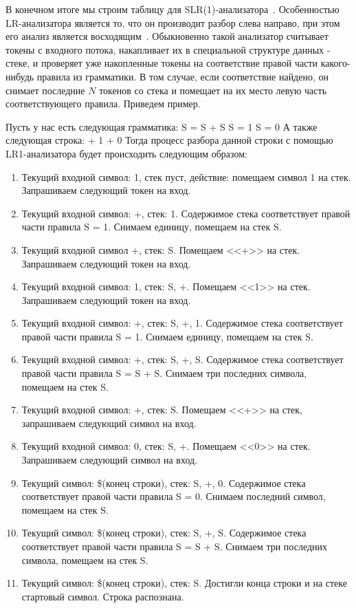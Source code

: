 В конечном итоге мы строим таблицу для SLR(1)-анализатора~\autocite{slr1}. Особенностью LR-анализатора является то, что он производит разбор слева направо, при этом его анализ является восходящим~\autocite{GLR-pars-algo}. Обыкновенно такой анализатор считывает токены с входного потока, накапливает их в специальной структуре данных - стеке, и проверяет уже накопленные токены на соответствие правой части какого-нибудь правила из грамматики. В том случае, если соответствие найдено, он снимает последние $N$ токенов со стека и помещает на их место левую часть соответствующего правила. Приведем пример.
\begin{myexample}
\label{examp:LRParser}
Пусть у нас есть следующая грамматика:\newline
S = S + S\newline
S = 1\newline
S = 0\newline
А также следующая строка: + 1 + 0\newline
Тогда процесс разбора данной строки с помощью LR1-анализатора будет происходить следующим образом:\newline
\begin{enumerate}
  \item Текущий входной символ: 1, стек пуст, действие: помещаем символ 1 на стек. Запрашиваем следующий токен на вход.
  \item Текущий входной символ: +, стек: 1. Содержимое стека соответствует правой части правила S = 1. Снимаем единицу, помещаем на стек S.
  \item Текущий входной символ +, стек: S. Помещаем <<+>> на стек. Запрашиваем следующий токен на вход.
  \item Текущий входной символ: 1, стек: S, +. Помещаем <<1>> на стек. Запрашиваем следующий токен на вход.
  \item Текущий входной символ: +, стек: S, +, 1. Содержимое стека соответствует правой части правила S = 1. Снимаем единицу, помещаем на стек S.
  \item Текущий входной символ: +, стек: S, +, S. Содержимое стека соответствует правой части правила S = S + S. Снимаем три последних символа, помещаем на стек S.
  \item Текущий входной символ: +, стек: S. Помещаем <<+>> на стек, запрашиваем следующий символ на вход.
  \item Текущий входной символ: 0, стек: S, +. Помещаем <<0>> на стек. Запрашиваем следующий символ на вход.
  \item Текущий символ: \$(конец строки), стек: S, +, 0. Содержимое стека соответствует правой части правила S = 0. Снимаем последний символ, помещаем на стек S.
  \item Текущий символ: \$(конец строки), стек: S, +, S. Содержимое стека соответствует правой части правила S = S + S. Снимаем три последних символа, помещаем на стек S.
  \item Текущий символ: \$(конец строки), стек: S. Достигли конца строки и на стеке стартовый символ. Строка распознана.
\end{enumerate}
\end{myexample}

